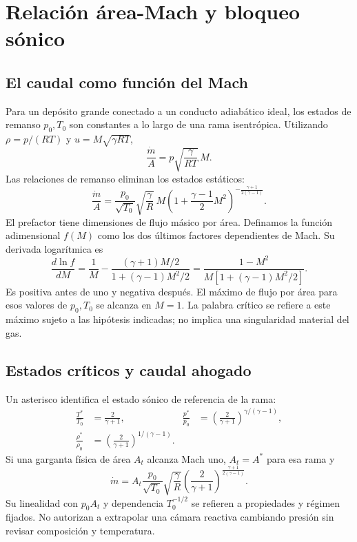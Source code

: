 \chapter{Relación área-Mach y bloqueo sónico}\label{ch:06}
\section{El caudal como función del Mach}
Para un depósito grande conectado a un conducto adiabático ideal, los estados de remanso $p_0,T_0$ son constantes a lo largo de una rama isentrópica. Utilizando $\rho=p/(RT)$ y $u=M\sqrt{\gamma RT}$,
\[
 \frac{\dot m}{A}=p\sqrt{\frac{\gamma}{RT}}\,M.
\]
Las relaciones de remanso eliminan los estados estáticos:
\begin{equation}\label{eq:massfunction}
 \frac{\dot m}{A}=\frac{p_0}{\sqrt{T_0}}\sqrt{\frac{\gamma}{R}}\,
 M\left(1+\frac{\gamma-1}{2}M^2\right)^{-\frac{\gamma+1}{2(\gamma-1)}}.
\end{equation}
El prefactor tiene dimensiones de flujo másico por área. Definamos la función adimensional $f(M)$ como los dos últimos factores dependientes de Mach. Su derivada logarítmica es
\[
 \frac{d\ln f}{dM}=\frac1M-
 \frac{(\gamma+1)M/2}{1+(\gamma-1)M^2/2}
 =\frac{1-M^2}{M[1+(\gamma-1)M^2/2]}.
\]
Es positiva antes de uno y negativa después. El máximo de flujo por área para esos valores de $p_0,T_0$ se alcanza en $M=1$. La palabra crítico se refiere a este máximo sujeto a las hipótesis indicadas; no implica una singularidad material del gas.
\section{Estados críticos y caudal ahogado}
Un asterisco identifica el estado sónico de referencia de la rama:
\begin{align}
 \frac{T^*}{T_0}&=\frac{2}{\gamma+1},&
 \frac{p^*}{p_0}&=\left(\frac{2}{\gamma+1}\right)^{\gamma/(\gamma-1)},\\
 \frac{\rho^*}{\rho_0}&=\left(\frac{2}{\gamma+1}\right)^{1/(\gamma-1)}.
\end{align}
Si una garganta física de área $A_t$ alcanza Mach uno, $A_t=A^*$ para esa rama y
\begin{equation}\label{eq:choked}
 \boxed{\dot m=A_t\frac{p_0}{\sqrt{T_0}}\sqrt{\frac{\gamma}{R}}
 \left(\frac{2}{\gamma+1}\right)^{\frac{\gamma+1}{2(\gamma-1)}}}.
\end{equation}
Su linealidad con $p_0A_t$ y dependencia $T_0^{-1/2}$ se refieren a propiedades y régimen fijados. No autorizan a extrapolar una cámara reactiva cambiando presión sin revisar composición y temperatura.

